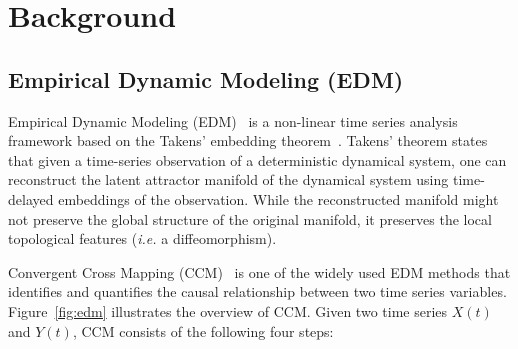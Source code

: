 \documentclass[sigconf]{acmart}
\begin{document}
\section{Background}\label{sec:background}

\subsection{Empirical Dynamic Modeling (EDM)}\label{sec:edm}

Empirical Dynamic Modeling (EDM)~\cite{Chang2017,Ye2015} is a non-linear time
series analysis framework based on the Takens' embedding
theorem~\cite{Takens1981,Deyle2011}. Takens' theorem states that given a time-series
observation of a deterministic dynamical system, one can reconstruct the
latent attractor manifold of the dynamical system using time-delayed
embeddings of the observation. While the reconstructed manifold might not
preserve the global structure of the original manifold, it preserves the local
topological features (\textit{i.e.} a diffeomorphism).

Convergent Cross Mapping (CCM)~\cite{Sugihara2012,Natsukawa2017,VanBerkel2020}
is one of the widely used EDM methods that identifies and quantifies the causal
relationship between two time series variables. Figure~\ref{fig:edm} illustrates the
overview of CCM\@. Given two time series $X(t)$ and $Y(t)$, CCM consists of the following four
steps:
\end{document}
